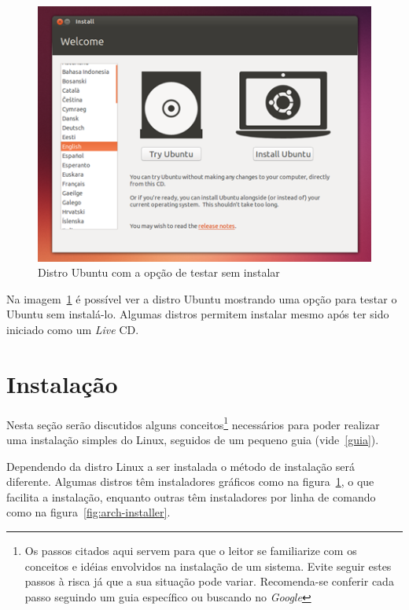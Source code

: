 \documentclass{handout_utfpr}
\begin{document}
\begin{figure}[!h]
  \centering
  \includegraphics[scale=.5]{imagens/ubuntu-livecd.png}
  \caption{Distro Ubuntu com a opção de testar sem instalar}
  \label{fig:ubuntu-live}
\end{figure}

Na imagem~\ref{fig:ubuntu-live} é possível ver a distro Ubuntu mostrando uma opção para testar o Ubuntu sem instalá-lo. Algumas distros permitem instalar mesmo após ter sido iniciado como um \textit{Live} CD.

\section{Instalação}
Nesta seção serão discutidos alguns conceitos\footnote{Os passos citados aqui servem para que o leitor se familiarize com os conceitos e idéias envolvidos na instalação de um sistema. Evite seguir estes passos à risca já que a sua situação pode variar. Recomenda-se conferir cada passo seguindo um guia específico ou buscando no \emph{Google}} necessários para poder realizar uma instalação simples do Linux, seguidos de um pequeno guia (vide~\ref{guia}).

Dependendo da distro Linux a ser instalada o método de instalação será diferente. Algumas distros têm instaladores gráficos como na figura~\ref{fig:ubuntu-live}, o que facilita a instalação, enquanto outras têm instaladores por linha de comando como na figura~\ref{fig:arch-installer}.
\end{document}

